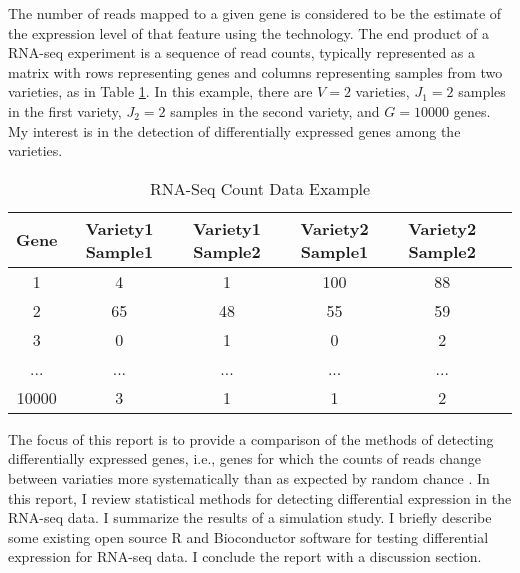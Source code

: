 The number of reads mapped to a given gene is considered to be the estimate of the expression level of that feature using the technology. The end product of a RNA-seq experiment is a sequence of read counts, typically represented as a matrix with rows representing genes and columns representing samples from two varieties, as in Table \ref{tab:RNA-Seq Data}. In this example, there are $V=2$ varieties, $J_1 = 2$ samples in the first variety, $J_2=2$ samples in the second variety, and $G=10000$ genes. My interest is in the detection of differentially expressed genes among the varieties. 

\begin{table}[H]
\begin{center}
    \begin{tabular}{|c|c|c|c|c|c|}
      \hline
      Gene &Variety1 Sample1 &Variety1 Sample2 &Variety2 Sample1 & Variety2 Sample2 \\
      \hline
      1 & 4 & 1 & 100 & 88 \\
      \hline
      2 & 65 & 48 & 55 & 59 \\
      \hline
      3 & 0 & 1 & 0 & 2\\
      \hline
      ... & ... & ... & ... & ...\\
      \hline
       10000 & 3 & 1 & 1 & 2\\
       \hline
    \end{tabular}
\end{center}
\caption{RNA-Seq Count Data Example}
\label{tab:RNA-Seq Data}
\end{table}

The focus of this report is to provide a comparison of the methods of detecting differentially expressed genes, i.e., genes for which the counts of reads change between variaties more systematically than as expected by random chance \citep{oshlack2010rna}. In this report, I review statistical methods for detecting differential expression in the RNA-seq data. I summarize the results of a simulation study. I briefly describe some existing open source R and Bioconductor software for testing differential expression for RNA-seq data. I conclude the report with a discussion section. 

